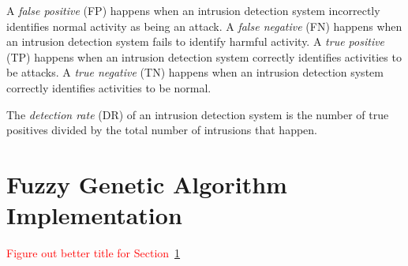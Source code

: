 \documentclass{sig-alternate}
\newcommand{\mycomment}[1]{\textcolor{red}{#1}}
\begin{document}
A \emph{false positive} (FP) happens when an intrusion detection system incorrectly identifies normal activity as being an attack. A \emph{false negative} (FN) happens when an intrusion detection system fails to identify harmful activity. A \emph{true positive} (TP) happens when an intrusion detection system correctly identifies activities to be attacks. A \emph{true negative} (TN) happens when an intrusion detection system correctly identifies activities to be normal.

The \emph{detection rate} (DR) of an intrusion detection system is the number of true positives divided by the total number of intrusions that happen.~\cite{ids}




\section{Fuzzy Genetic Algorithm Implementation}
\label{sec:fuzGenAlgImp}
\mycomment{Figure out better title for Section~\ref{sec:fuzGenAlgImp}}
\end{document}
